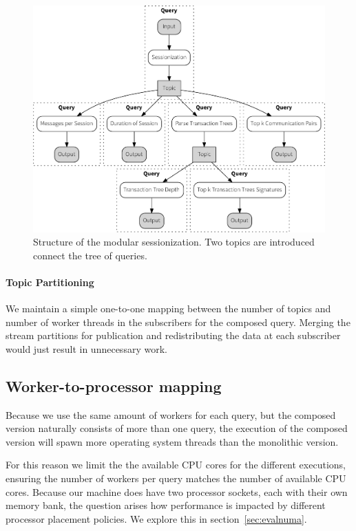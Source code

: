 \begin{figure}[p]
  \centering
    \includegraphics[width=1\textwidth]{figures/sessionize_split-crop}
  \caption[Dataflow graph for modular sessionization]{Structure of the modular
  sessionization. Two topics are introduced connect the tree of queries.}
  \label{fig:split}
\end{figure}

\paragraph{Topic Partitioning}

We maintain a simple one-to-one mapping between the number of topics and
number of worker threads in the subscribers for the composed query.
Merging the stream partitions for publication and redistributing
the data at each subscriber would just result in unnecessary work.


\subsection{Worker-to-processor mapping}

Because we use the same amount of workers for each query, but the composed
version naturally consists of more than one query, the execution of the
composed version will spawn more operating system threads than
the monolithic version.

For this reason we limit the the available CPU cores for the different executions,
ensuring the number of workers per query matches the number of available CPU cores.
Because our machine does have two processor sockets, each with their own memory bank,
the question arises how performance is impacted by different processor placement
policies. We explore this in section~\ref{sec:evalnuma}.

